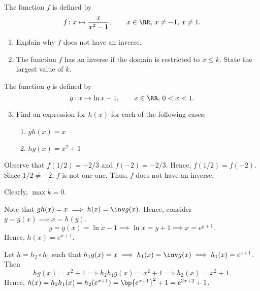 \begin{problem}
    The function $f$ is defined by \[f \colon x \mapsto \frac{x}{x^2 - 1}, \qquad x \in \RR, \, x \neq -1, \, x \neq 1.\]

    \begin{enumerate}
        \item Explain why $f$ does not have an inverse.
        \item The function $f$ has an inverse if the domain is restricted to $x \leq k$. State the largest value of $k$.
    \end{enumerate}

    The function $g$ is defined by \[g \colon x \mapsto \ln x - 1, \qquad x \in \RR, \, 0 < x < 1.\]

    \begin{enumerate}
        \setcounter{enumi}{2}
        \item Find an expression for $h(x)$ for each of the following cases:
        \begin{enumerate}
            \item $gh(x) = x$
            \item $hg(x) = x^2+1$
        \end{enumerate}
    \end{enumerate}
\end{problem}
\begin{solution}
    \begin{ppart}
        Observe that $f(1/2) = -2/3$ and $f(-2) = -2/3$. Hence, $f(1/2) = f(-2)$. Since $1/2 \neq -2$, $f$ is not one-one. Thus, $f$ does not have an inverse.
    \end{ppart}
    \begin{ppart}
        Clearly, $\max k = 0$.
    \end{ppart}
    \begin{ppart}
        \begin{psubpart}
            Note that $gh(x) = x \implies h(x) = \inv g(x)$. Hence, consider $y = g(x) \implies x = h(y)$. \[y = g(x) = \ln x - 1 \implies \ln x = y+1 \implies x = e^{y+1}.\] Hence, $h(x) = e^{x+1}$.
        \end{psubpart}
        \begin{psubpart}
            Let $h = h_2 \circ h_1$ such that $h_1g(x) = x \implies h_1(x) = \inv g(x) \implies h_1(x) = e^{x+1}$. Then \[hg(x) = x^2+1 \implies h_2h_1g(x) = x^2+1 \implies h_2(x) = x^2+1.\] Hence, $h(x) = h_2h_1(x) = h_2(e^{x+1}) = \bp{e^{x+1}}^2 + 1 = e^{2x+2} + 1$.
        \end{psubpart}
    \end{ppart}
\end{solution}